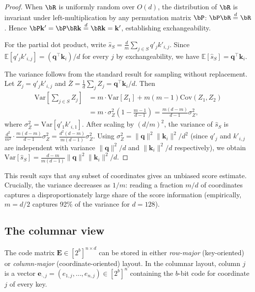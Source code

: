 \documentclass[10pt,twocolumn]{article}
\theoremstyle{definition}
\newcommand{\E}{\mathbb{E}}
\newcommand{\Var}{\mathrm{Var}}
\newcommand{\bq}{\mathbf{q}}
\newcommand{\bk}{\mathbf{k}}
\begin{document}
\begin{proof}
  When $\bR$ is uniformly random over $O(d)$, the distribution of $\bR$ is
  invariant under left-multiplication by any permutation matrix $\bP$:
  $\bP \bR \overset{d}{=} \bR$.  Hence $\bP \bk' = \bP \bR \bk
  \overset{d}{=} \bR \bk = \bk'$, establishing exchangeability.

  For the partial dot product, write
  $\hat{s}_S = \frac{d}{m} \sum_{j \in S} q'_j k'_{i,j}$.
  Since $\E[q'_j k'_{i,j}] = (\bq^\top \bk_i) / d$ for every $j$ by
  exchangeability, we have $\E[\hat{s}_S] = \bq^\top \bk_i$.

  The variance follows from the standard result for sampling without replacement.
  Let $Z_j = q'_j k'_{i,j}$ and $\bar{Z} = \frac{1}{d} \sum_j Z_j =
  \bq^\top \bk_i / d$.  Then
  \begin{align*}
    \Var\!\left[\sum_{j \in S} Z_j\right]
      &= m \cdot \Var[Z_1] + m(m-1)\mathrm{Cov}(Z_1, Z_2) \\
      &= m \cdot \sigma_Z^2 \left(1 - \frac{m-1}{d-1}\right)
       = \frac{m(d-m)}{d-1} \sigma_Z^2,
  \end{align*}
  where $\sigma_Z^2 = \Var[q'_1 k'_{i,1}]$.  After scaling by $(d/m)^2$, the
  variance of $\hat{s}_S$ is $\frac{d^2}{m^2} \cdot \frac{m(d-m)}{d-1}
  \sigma_Z^2 = \frac{d^2(d-m)}{m(d-1)} \sigma_Z^2$.  Using
  $\sigma_Z^2 = \|\bq\|^2 \|\bk_i\|^2 / d^2$ (since $q'_j$ and $k'_{i,j}$ are
  independent with variance $\|\bq\|^2/d$ and $\|\bk_i\|^2/d$ respectively),
  we obtain $\Var[\hat{s}_S] = \frac{d-m}{m(d-1)} \|\bq\|^2 \|\bk_i\|^2 / d$.
\end{proof}

This result says that \emph{any} subset of coordinates gives an unbiased score
estimate.  Crucially, the variance decreases as $1/m$: reading a fraction
$m/d$ of coordinates captures a disproportionately large share of the score
information (empirically, $m = d/2$ captures 92\% of the variance for $d = 128$).

\subsection{The columnar view}

The code matrix $\mathbf{E} \in [2^b]^{n \times d}$ can be stored in either
\emph{row-major} (key-oriented) or \emph{column-major} (coordinate-oriented)
layout.  In the columnar layout, column $j$ is a vector
$\mathbf{e}_{\cdot,j} = (e_{1,j}, \ldots, e_{n,j}) \in [2^b]^n$ containing
the $b$-bit code for coordinate $j$ of every key.
\end{document}
